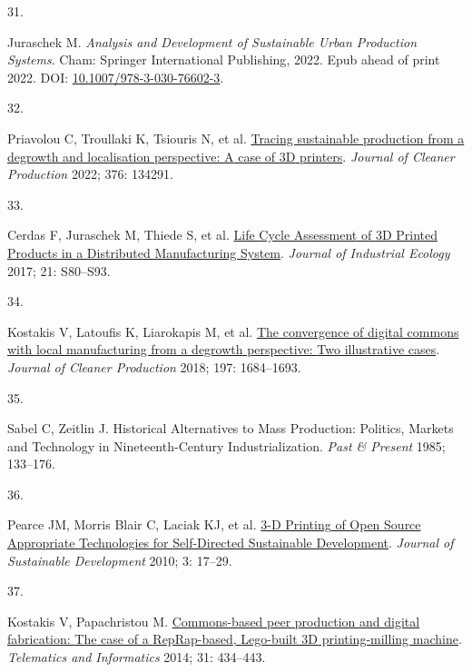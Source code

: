 \documentclass[
  11pt,
  a4paperpaper,
  onecolumn]{article}
\newlength{\cslhangindent}
\newlength{\csllabelwidth}
\newlength{\cslentryspacingunit} %
\newenvironment{CSLReferences}[2] %
 {%
  \setlength{\parindent}{0pt}
  \ifodd #1
  \let\oldpar\par
  \def\par{\hangindent=\cslhangindent\oldpar}
  \fi
  \setlength{\parskip}{#2\cslentryspacingunit}
 }%
 {}
\newcommand{\CSLLeftMargin}[1]{\parbox[t]{\csllabelwidth}{#1}}
\newcommand{\CSLRightInline}[1]{\parbox[t]{\linewidth - \csllabelwidth}{#1}\break}
\begin{document}
\begin{CSLReferences}{0}{0}
\leavevmode{}%
\CSLLeftMargin{31. }%
\CSLRightInline{Juraschek M. \emph{Analysis and {Development} of
{Sustainable Urban Production Systems}}. {Cham}: {Springer International
Publishing}, 2022. Epub ahead of print 2022. DOI:
\href{https://doi.org/10.1007/978-3-030-76602-3}{10.1007/978-3-030-76602-3}.}

\leavevmode{}%
\CSLLeftMargin{32. }%
\CSLRightInline{Priavolou C, Troullaki K, Tsiouris N, et al.
\href{https://doi.org/10.1016/j.jclepro.2022.134291}{Tracing sustainable
production from a degrowth and localisation perspective: {A} case of
{3D} printers}. \emph{Journal of Cleaner Production} 2022; 376: 134291.}

\leavevmode{}%
\CSLLeftMargin{33. }%
\CSLRightInline{Cerdas F, Juraschek M, Thiede S, et al.
\href{https://doi.org/10.1111/jiec.12618}{Life {Cycle Assessment} of {3D
Printed Products} in a {Distributed Manufacturing System}}.
\emph{Journal of Industrial Ecology} 2017; 21: S80--S93.}

\leavevmode{}%
\CSLLeftMargin{34. }%
\CSLRightInline{Kostakis V, Latoufis K, Liarokapis M, et al.
\href{https://doi.org/10.1016/j.jclepro.2016.09.077}{The convergence of
digital commons with local manufacturing from a degrowth perspective:
{Two} illustrative cases}. \emph{Journal of Cleaner Production} 2018;
197: 1684--1693.}

\leavevmode{}%
\CSLLeftMargin{35. }%
\CSLRightInline{Sabel C, Zeitlin J. Historical {Alternatives} to {Mass
Production}: {Politics}, {Markets} and {Technology} in
{Nineteenth-Century Industrialization}. \emph{Past \& Present} 1985;
133--176.}

\leavevmode{}%
\CSLLeftMargin{36. }%
\CSLRightInline{Pearce JM, Morris Blair C, Laciak KJ, et al.
\href{https://doi.org/10.5539/jsd.v3n4p17}{3-{D Printing} of {Open
Source Appropriate Technologies} for {Self-Directed Sustainable
Development}}. \emph{Journal of Sustainable Development} 2010; 3:
17--29.}

\leavevmode{}%
\CSLLeftMargin{37. }%
\CSLRightInline{Kostakis V, Papachristou M.
\href{https://doi.org/10.1016/j.tele.2013.09.006}{Commons-based peer
production and digital fabrication: {The} case of a {RepRap-based},
{Lego-built 3D} printing-milling machine}. \emph{Telematics and
Informatics} 2014; 31: 434--443.}


\end{CSLReferences}
\end{document}
